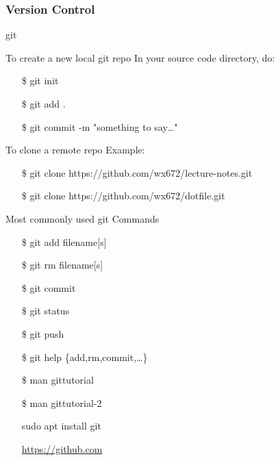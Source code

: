 \subsubsection{Version Control}
\label{sec:version-control}

\begin{frame}{git}
  \begin{block}{To create a new local git repo}
    In your source code directory, do:\ttfamily
    \begin{itemize}
    \item[\$] git init
    \item[\$] git add .
    \item[\$] git commit -m "something to say\ldots"
    \end{itemize}
  \end{block}
  \begin{block}{To clone a remote repo}
    Example:\ttfamily
    \begin{itemize}
    \item[\$] git clone https://github.com/wx672/lecture-notes.git
    \item[\$] git clone https://github.com/wx672/dotfile.git
    \end{itemize}
  \end{block}
\end{frame}

\begin{frame}
  \begin{block}{Most commonly used git Commands}\ttfamily
    \begin{itemize}
    \item[\$] git add filename[s]
    \item[\$] git rm filename[s]
    \item[\$] git commit
    \item[\$] git status\qquad{}\qquad{}
    \item[\$] git push\qquad{}
    \item[\$] git help \{add,rm,commit,\ldots\}
    \end{itemize}
  \end{block}
  \begin{multicols}{2}
    \begin{itemize}
    \item[\$] man gittutorial
    \item[\$] man gittutorial-2
    \item[\debian] sudo apt install git
    \item[\github] \url{https://github.com}
    \end{itemize}
  \end{multicols}
\end{frame}

